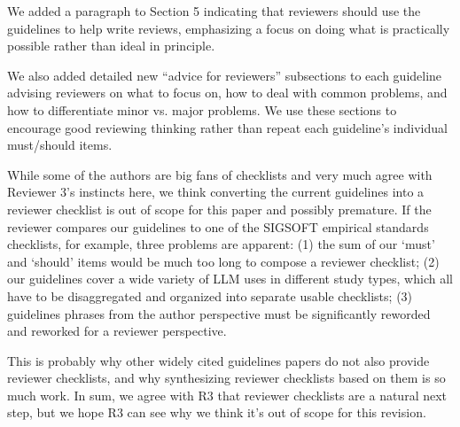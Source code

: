 \documentclass[12pt,english]{reviewresponse}
\begin{document}
\begin{revresponse}
   We added a paragraph to Section 5 indicating that reviewers should use the guidelines to help write reviews, emphasizing a focus on doing what is practically possible rather than ideal in principle. 

   We also added detailed new ``advice for reviewers'' subsections to each guideline advising reviewers on what to focus on, how to deal with common problems, and how to differentiate minor vs. major problems. We use these sections to encourage good reviewing thinking rather than repeat each guideline's individual must/should items.  

   While some of the authors are big fans of checklists and very much agree with Reviewer 3's instincts here, we think converting the current guidelines into a reviewer checklist is out of scope for this paper and possibly premature. If the reviewer compares our guidelines to one of the SIGSOFT empirical standards checklists, for example, three problems are apparent: (1) the sum of our `must' and `should' items would be much too long to compose a reviewer checklist; (2) our guidelines cover a wide variety of LLM uses in different study types, which all have to be disaggregated and organized into separate usable checklists; (3) guidelines phrases from the author perspective must be significantly reworded and reworked for a reviewer perspective. 

   This is probably why other widely cited guidelines papers do not also provide reviewer checklists, and why synthesizing reviewer checklists based on them is so much work. In sum, we agree with R3 that reviewer checklists are a natural next step, but we hope R3 can see why we think it's out of scope for this revision. 
\end{revresponse}

\begin{revresponse}

\end{revresponse}
\end{document}
